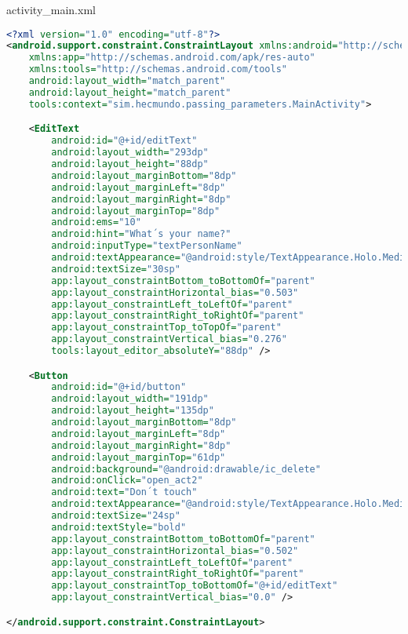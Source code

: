 \documentclass{report}
\begin{document}
activity\_main.xml
\begin{lstlisting}[language=xml]
<?xml version="1.0" encoding="utf-8"?>
<android.support.constraint.ConstraintLayout xmlns:android="http://schemas.android.com/apk/res/android"
    xmlns:app="http://schemas.android.com/apk/res-auto"
    xmlns:tools="http://schemas.android.com/tools"
    android:layout_width="match_parent"
    android:layout_height="match_parent"
    tools:context="sim.hecmundo.passing_parameters.MainActivity">

    <EditText
        android:id="@+id/editText"
        android:layout_width="293dp"
        android:layout_height="88dp"
        android:layout_marginBottom="8dp"
        android:layout_marginLeft="8dp"
        android:layout_marginRight="8dp"
        android:layout_marginTop="8dp"
        android:ems="10"
        android:hint="What´s your name?"
        android:inputType="textPersonName"
        android:textAppearance="@android:style/TextAppearance.Holo.Medium"
        android:textSize="30sp"
        app:layout_constraintBottom_toBottomOf="parent"
        app:layout_constraintHorizontal_bias="0.503"
        app:layout_constraintLeft_toLeftOf="parent"
        app:layout_constraintRight_toRightOf="parent"
        app:layout_constraintTop_toTopOf="parent"
        app:layout_constraintVertical_bias="0.276"
        tools:layout_editor_absoluteY="88dp" />

    <Button
        android:id="@+id/button"
        android:layout_width="191dp"
        android:layout_height="135dp"
        android:layout_marginBottom="8dp"
        android:layout_marginLeft="8dp"
        android:layout_marginRight="8dp"
        android:layout_marginTop="61dp"
        android:background="@android:drawable/ic_delete"
        android:onClick="open_act2"
        android:text="Don´t touch"
        android:textAppearance="@android:style/TextAppearance.Holo.Medium"
        android:textSize="24sp"
        android:textStyle="bold"
        app:layout_constraintBottom_toBottomOf="parent"
        app:layout_constraintHorizontal_bias="0.502"
        app:layout_constraintLeft_toLeftOf="parent"
        app:layout_constraintRight_toRightOf="parent"
        app:layout_constraintTop_toBottomOf="@+id/editText"
        app:layout_constraintVertical_bias="0.0" />

</android.support.constraint.ConstraintLayout>

\end{lstlisting}
\end{document}

